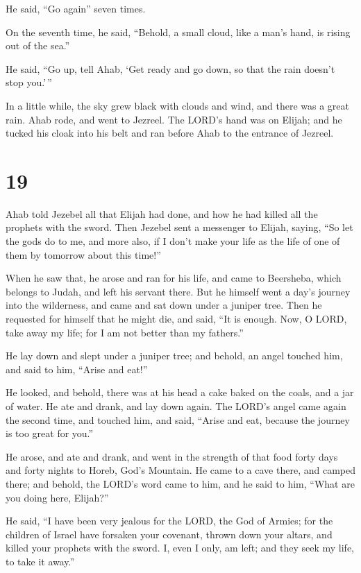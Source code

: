 He said, ``Go again'' seven times.

 On the seventh time, he said, ``Behold, a small cloud,
like a man's hand, is rising out of the sea.''

He said, ``Go up, tell Ahab, `Get ready and go down, so that the rain
doesn't stop you.'\,''

 In a little while, the sky grew black with clouds and
wind, and there was a great rain. Ahab rode, and went to Jezreel.
 The LORD's hand was on Elijah; and he tucked his cloak
into his belt and ran before Ahab to the entrance of Jezreel.

\hypertarget{section-18}{%
\section{19}\label{section-18}}

 Ahab told Jezebel all that Elijah had done, and how he
had killed all the prophets with the sword.  Then Jezebel
sent a messenger to Elijah, saying, ``So let the gods do to me, and more
also, if I don't make your life as the life of one of them by tomorrow
about this time!''

 When he saw that, he arose and ran for his life, and came
to Beersheba, which belongs to Judah, and left his servant there.
 But he himself went a day's journey into the wilderness,
and came and sat down under a juniper tree. Then he requested for
himself that he might die, and said, ``It is enough. Now, O LORD, take
away my life; for I am not better than my fathers.''

 He lay down and slept under a juniper tree; and behold,
an angel touched him, and said to him, ``Arise and eat!''

 He looked, and behold, there was at his head a cake baked
on the coals, and a jar of water. He ate and drank, and lay down again.
 The LORD's angel came again the second time, and touched
him, and said, ``Arise and eat, because the journey is too great for
you.''

 He arose, and ate and drank, and went in the strength of
that food forty days and forty nights to Horeb, God's Mountain.
 He came to a cave there, and camped there; and behold,
the LORD's word came to him, and he said to him, ``What are you doing
here, Elijah?''

 He said, ``I have been very jealous for the LORD, the
God of Armies; for the children of Israel have forsaken your covenant,
thrown down your altars, and killed your prophets with the sword. I,
even I only, am left; and they seek my life, to take it away.''

